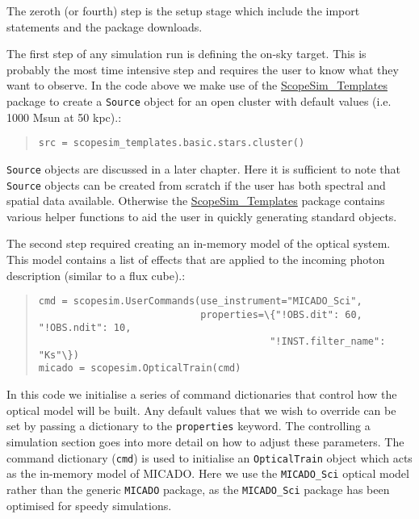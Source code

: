 The zeroth (or fourth) step is the setup stage which include the import statements and the package downloads.

The first step of any simulation run is defining the on-sky target.
This is probably the most time intensive step and requires the user to know what they want to observe.
In the code above we make use of the \href{https://scopesim-templates.readthedocs.io/en/latest/}{ScopeSim\_Templates} package to create a \texttt{Source} object for an open cluster with default values (i.e. 1000 Msun at 50 kpc).:

\begin{quote}
\begin{alltt}
\begin{lstlisting}[frame=single]
src = scopesim_templates.basic.stars.cluster()
\end{lstlisting}
\end{alltt}
\end{quote}

\texttt{Source} objects are discussed in a later chapter.
Here it is sufficient to note that \texttt{Source} objects can be created from scratch if the user has both spectral and spatial data available.
Otherwise the \href{https://scopesim-templates.readthedocs.io/en/latest/}{ScopeSim\_Templates} package contains various helper functions to aid the user in quickly generating \textquotedbl{}standard\textquotedbl{} objects.

The second step required creating an in-memory model of the optical system.
This model contains a list of effects that are applied to the incoming photon description (similar to a flux cube).:

\begin{quote}
\begin{alltt}
\begin{lstlisting}[frame=single]
cmd = scopesim.UserCommands(use_instrument="MICADO_Sci",
                            properties=\{"!OBS.dit": 60, "!OBS.ndit": 10,
                                        "!INST.filter_name": "Ks"\})
micado = scopesim.OpticalTrain(cmd)
\end{lstlisting}
\end{alltt}
\end{quote}

In this code we initialise a series of command dictionaries that control how the optical model will be built.
Any default values that we wish to override can be set by passing a dictionary to the \texttt{properties} keyword.
The \textquotedbl{}controlling a simulation\textquotedbl{} section goes into more detail on how to adjust these parameters.
The command dictionary (\texttt{cmd}) is used to initialise an \texttt{OpticalTrain} object which acts as the in-memory model of MICADO.
Here we use the \texttt{MICADO\_Sci} optical model rather than the generic \texttt{MICADO} package, as the \texttt{MICADO\_Sci} package has been optimised for speedy simulations.

